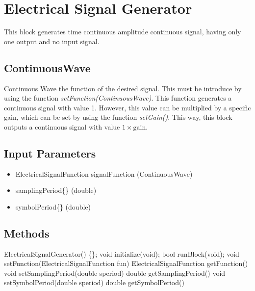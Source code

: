 \clearpage

\section{Electrical Signal Generator}

\maketitle
This block generates time continuous amplitude continuous signal, having only one output and no input signal.

\subsection{ContinuousWave}
Continuous Wave the function of the desired signal. This must be introduce by using the function \textit{setFunction(ContinuousWave)}. This function generates a continuous signal with value 1. However, this value can be multiplied by a specific gain, which can be set by using the function \textit{setGain()}. This way, this block outputs a continuous signal with value $1 \times \textrm{gain}$.

\subsection*{Input Parameters}

	\begin{itemize}
		\item ElectricalSignalFunction signalFunction{}\linebreak
		(ContinuousWave)
		\item samplingPeriod\{\}\linebreak
        (double)
		\item symbolPeriod\{\} \linebreak
        (double)
		
	\end{itemize}

\subsection*{Methods}

ElectricalSignalGenerator() \{\};
\bigbreak	
void initialize(void);
\bigbreak	
bool runBlock(void);
\bigbreak	
void setFunction(ElectricalSignalFunction fun)
ElectricalSignalFunction getFunction()
\bigbreak	
void setSamplingPeriod(double speriod)
double getSamplingPeriod()
\bigbreak
void setSymbolPeriod(double speriod)
double getSymbolPeriod()

